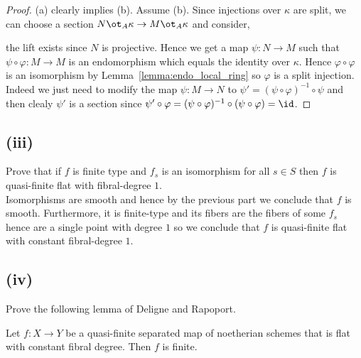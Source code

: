 \documentclass[12pt]{article}
\begin{document}
\begin{proof}
(a) clearly implies (b). Assume (b). Since injections over $\kappa$ are split, we can choose a section $N \ot_A \kappa \to M \ot_A \kappa$ and consider,
\begin{center}
\end{center}
the lift exists since $N$ is projective. Hence we get a map $\psi : N \to M$ such that $\psi \circ \varphi : M \to M$ is an endomorphism which equals the identity over $\kappa$. Hence $\varphi \circ \varphi$ is an isomorphism by Lemma~\ref{lemma:endo_local_ring} so $\varphi$ is a split injection. Indeed we just need to modify the map $\psi : M \to N$ to $\psi' = (\psi \circ \varphi)^{-1} \circ \psi$ and then clealy $\psi'$ is a section since $\psi' \circ \varphi = (\psi \circ \varphi)^{-1} \circ (\psi \circ \varphi) = \id$.
\end{proof}

\subsection{(iii)}

Prove that if $f$ is finite type and $f_s$ is an isomorphism for all $s \in S$ then $f$ is quasi-finite flat with fibral-degree $1$.
\bigskip\\
Isomorphisms are smooth and hence by the previous part we conclude that $f$ is smooth. Furthermore, it is finite-type and its fibers are the fibers of some $f_s$ hence are a single point with degree $1$ so we conclude that $f$ is quasi-finite flat with constant fibral-degree $1$.

\subsection{(iv)}

Prove the following lemma of Deligne and Rapoport.

\begin{prop}
Let $f : X \to Y$ be a quasi-finite separated map of noetherian schemes that is flat with constant fibral degree. Then $f$ is finite.
\end{prop}
\end{document}
